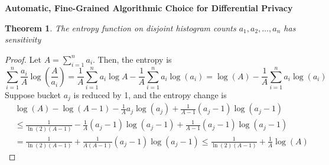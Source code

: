 \documentclass[10.5pt]{article}
\newtheorem{theorem}{Theorem}
\begin{document}
\centerline{\textbf{Automatic, Fine-Grained Algorithmic Choice for Differential Privacy}}
\begin{theorem}
The entropy function on disjoint histogram counts $a_1,a_2,\ldots, a_n$ has sensitivity 
\end{theorem}
\begin{proof}
Let $A = \sum_{i=1}^n a_i$. Then, the entropy is 
\[
\sum_{i=1}^n \frac{a_i}{A}\log\left(\frac{A}{a_i}\right) = \frac{1}{A}\sum_{i=1}^n a_i\log A - \frac{1}{A} \sum_{i=1}^n a_i\log(a_i) = \log(A) - \frac{1}{A}\sum_{i=1}^n a_i\log(a_i)
\]
Suppose bucket $a_j$ is reduced by 1, and the entropy change is
\begin{align*}
&\log(A) - \log(A-1) - \frac{1}{A} a_j\log(a_j) + \frac{1}{A-1} (a_j-1)\log(a_j-1) \\
&\leq \frac{1}{\ln(2)(A-1)} -\frac{1}{A}(a_j-1)\log(a_j-1) + \frac{1}{A-1}(a_j-1)\log(a_j-1) \\
&= \frac{1}{\ln(2)(A-1)}+\frac{1}{A(A-1)}(a_j-1)\log(a_j-1) \leq \frac{1}{\ln(2)(A-1)} + \frac{1}{A}\log(A)
\end{align*}

\end{proof}
\end{document}
